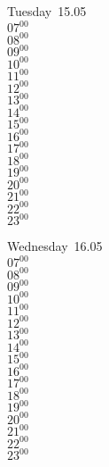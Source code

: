 \documentclass[11pt, a4paper]{book}\usepackage[]{graphicx}\usepackage[]{color}
\begin{document}
\begin{weekdaybox}
  Tuesday~15.05\\
  { 
  \vfill
  $07^{00}$\\
$08^{00}$\\
$09^{00}$\\
$10^{00}$\\
$11^{00}$\\
$12^{00}$\\
$13^{00}$\\
$14^{00}$\\
$15^{00}$\\
$16^{00}$\\
$17^{00}$\\
$18^{00}$\\
$19^{00}$\\
$20^{00}$\\
$21^{00}$\\
$22^{00}$\\
$23^{00}$\\
  }
\end{weekdaybox}
\begin{weekdaybox}
  Wednesday~16.05\\
  { 
  \vfill
  $07^{00}$\\
$08^{00}$\\
$09^{00}$\\
$10^{00}$\\
$11^{00}$\\
$12^{00}$\\
$13^{00}$\\
$14^{00}$\\
$15^{00}$\\
$16^{00}$\\
$17^{00}$\\
$18^{00}$\\
$19^{00}$\\
$20^{00}$\\
$21^{00}$\\
$22^{00}$\\
$23^{00}$\\
  }
\end{weekdaybox}
\clearpage
\begin{headerbox}
\end{headerbox}
\end{document}
